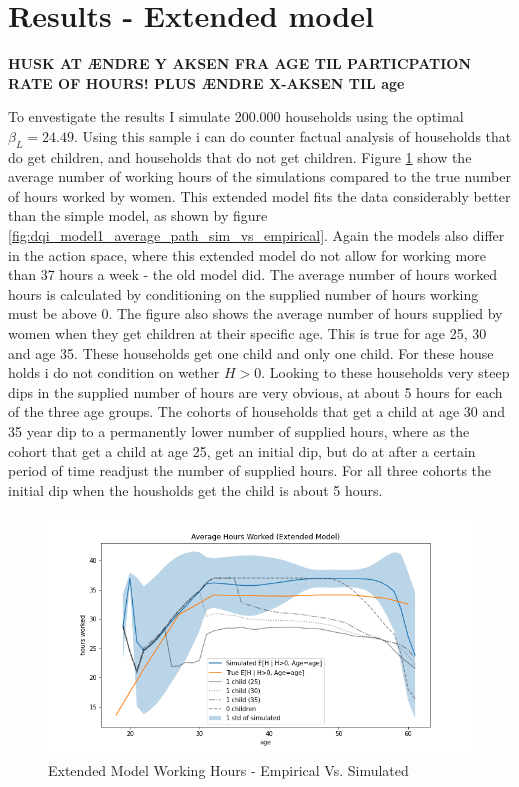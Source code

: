 \section{Results - Extended model}

\textbf{HUSK AT ÆNDRE Y AKSEN FRA AGE TIL PARTICPATION RATE OF HOURS! PLUS ÆNDRE X-AKSEN TIL age}

To envestigate the results I simulate 200.000 households using the optimal $\beta_L = 24.49$. Using this sample i can do counter factual analysis of households that do get children, and households that do not get children. Figure \ref{fig:ext_model_working_hours} show the average number of working hours of the simulations compared to the true number of hours worked by women. This extended model fits the data considerably better than the simple model, as shown by figure \ref{fig:dqi_model1_average_path_sim_vs_empirical}. Again the models also differ in the action space, where this extended model do not allow for working more than 37 hours a week - the old model did. The average number of hours worked hours is calculated by conditioning on the supplied number of hours working must be above 0. The figure also shows the average number of hours supplied by women when they get children at their specific age. This is true for age 25, 30 and age 35. These households get one child and only one child. For these house holds i do not condition on wether $H>0$. Looking to these households very steep dips in the supplied number of hours are very obvious, at about 5 hours for each of the three age groups. The cohorts of households that get a child at age 30 and 35 year dip to a permanently lower number of supplied hours, where as the cohort that get a child at age 25, get an initial dip, but do at after a certain period of time readjust the number of supplied hours. For all three cohorts the initial dip when the housholds get the child is about 5 hours.

\begin{figure}
    \centering
    \includegraphics[scale=0.4]{figures/extended_model_average_hours.png}
    \caption{Extended Model Working Hours - Empirical Vs. Simulated}
    \label{fig:ext_model_working_hours}
\end{figure}

